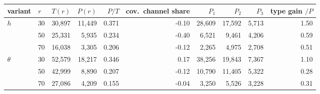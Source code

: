 \begin{tabular}{llrrrrrrrr}
\toprule
variant & $r$ & $T(r)$ & $P(r)$ & $P/T$ & cov.\ channel share & $P_1$ & $P_2$ & $P_3$ & type gain $/P$ \\
\midrule
$h$ & 30 & 30,897 & 11,449 & 0.371 & -0.10 & 28,609 & 17,592 & 5,713 & 1.50 \\
 & 50 & 25,331 & 5,935 & 0.234 & -0.40 & 6,521 & 9,461 & 4,206 & 0.59 \\
 & 70 & 16,038 & 3,305 & 0.206 & -0.12 & 2,265 & 4,975 & 2,708 & 0.51 \\
$\theta$ & 30 & 52,579 & 18,217 & 0.346 & 0.17 & 38,256 & 19,843 & 7,367 & 1.10 \\
 & 50 & 42,999 & 8,890 & 0.207 & -0.12 & 10,790 & 11,405 & 5,322 & 0.28 \\
 & 70 & 27,086 & 4,209 & 0.155 & -0.04 & 3,250 & 5,526 & 3,228 & 0.31 \\
\bottomrule
\end{tabular}
